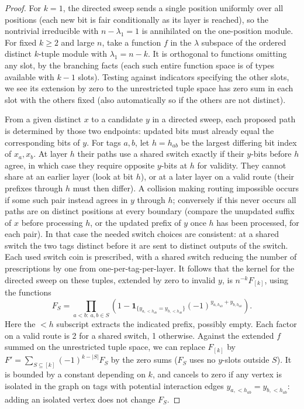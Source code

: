 \begin{proof}
For \(k=1\), the directed sweep sends a single position uniformly over all positions (each new bit is fair conditionally as its layer is reached), so the nontrivial irreducible with \(n-\lambda_1=1\) is annihilated on the one-position module. For fixed \(k\ge2\) and large \(n\), take a function \(f\) in the \(\lambda\) subspace of the ordered distinct \(k\)-tuple module with \(\lambda_1=n-k\). It is orthogonal to functions omitting any slot, by the branching facts (each such entire function space is of types available with \(k-1\) slots). Testing against indicators specifying the other slots, we see its extension by zero to the unrestricted tuple space has zero sum in each slot with the others fixed (also automatically so if the others are not distinct).

From a given distinct \(x\) to a candidate \(y\) in a directed sweep, each proposed path is determined by those two endpoints: updated bits must already equal the corresponding bits of \(y\). For tags \(a,b\), let \(h=h_{ab}\) be the largest differing bit index of \(x_a,x_b\). At layer \(h\) their paths use a shared switch exactly if their \(y\)-bits before \(h\) agree, in which case they require opposite \(y\)-bits at \(h\) for validity. They cannot share at an earlier layer (look at bit \(h\)), or at a later layer on a valid route (their prefixes through \(h\) must then differ). A collision making routing impossible occurs if some such pair instead agrees in \(y\) through \(h\); conversely if this never occurs all paths are on distinct positions at every boundary (compare the unupdated suffix of \(x\) before processing \(h\), or the updated prefix of \(y\) once \(h\) has been processed, for each pair). In that case the needed switch choices are consistent: at a shared switch the two tags distinct before it are sent to distinct outputs of the switch. Each used switch coin is prescribed, with a shared switch reducing the number of prescriptions by one from one-per-tag-per-layer. It follows that the kernel for the directed sweep on these tuples, extended by zero to invalid \(y\), is \(n^{-k}F_{[k]}\), using the functions
\[
F_S=\prod_{a<b:\ a,b\in S}
\left(1-\mathbf1_{\{y_{a,<h_{ab}}=y_{b,<h_{ab}}\}}
                  (-1)^{y_{a,h_{ab}}+y_{b,h_{ab}}}\right).
\]
Here the \(<h\) subscript extracts the indicated prefix, possibly empty. Each factor on a valid route is 2 for a shared switch, 1 otherwise. Against the extended \(f\) summed on the unrestricted tuple space, we can replace \(F_{[k]}\) by \(F'=\sum_{S\subseteq[k]}(-1)^{k-|S|}F_S\) by the zero sums (\(F_S\) uses no \(y\)-slots outside \(S\)). It is bounded by a constant depending on \(k\), and cancels to zero if any vertex is isolated in the graph on tags with potential interaction edges \(y_{a,<h_{ab}}=y_{b,<h_{ab}}\): adding an isolated vertex does not change \(F_S\).


\end{proof}
